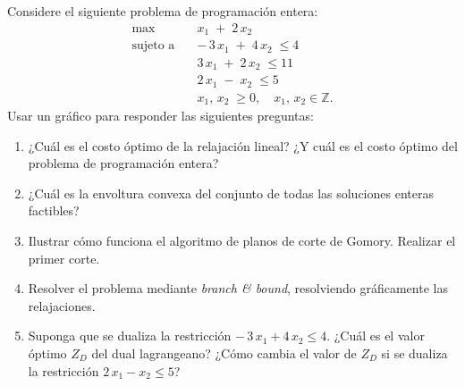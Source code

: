Considere el siguiente problema de programación entera:
\[
\begin{aligned}
\max\quad & x_{1} \;+\; 2\,x_{2} \\[0.5em]
\text{sujeto a}\quad 
& -\,3\,x_{1} \;+\; 4\,x_{2} \;\le 4\\
& 3\,x_{1} \;+\; 2\,x_{2} \;\le 11\\
& 2\,x_{1} \;-\; x_{2} \;\le 5\\
& x_{1},\,x_{2} \;\ge 0,\quad x_{1},\,x_{2} \in \mathbb{Z}.
\end{aligned}
\]
Usar un gráfico para responder las siguientes preguntas:

\begin{enumerate}
  \item[(a)] ¿Cuál es el costo óptimo de la relajación lineal? ¿Y cuál es el costo óptimo del problema de programación entera?
  \item[(b)] ¿Cuál es la envoltura convexa del conjunto de todas las soluciones enteras factibles?
  \item[(c)] Ilustrar cómo funciona el algoritmo de planos de corte de Gomory. Realizar el primer corte.
  \item[(d)] Resolver el problema mediante \emph{branch \& bound}, resolviendo gráficamente las relajaciones.
  \item[(e)] Suponga que se dualiza la restricción \( -\,3\,x_{1} + 4\,x_{2} \le 4 \). ¿Cuál es el valor óptimo \(Z_{D}\) del dual lagrangeano? ¿Cómo cambia el valor de $Z_D$ si se dualiza la restricción \( 2\,x_{1} - x_{2} \le 5 \)? 
\end{enumerate}
